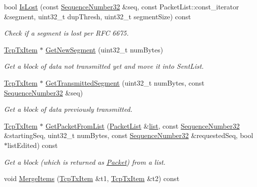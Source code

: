 \begin{DoxyCompactItemize}
\item 
bool \hyperlink{classns3_1_1TcpTxBuffer_abef1df59556801517ac6f99c3bf135cf}{Is\+Lost} (const \hyperlink{group__network_gacb2070e4e98d2d5135c9bede58f07a03}{Sequence\+Number32} \&seq, const Packet\+List\+::const\+\_\+iterator \&segment, uint32\+\_\+t dup\+Thresh, uint32\+\_\+t segment\+Size) const 
\begin{DoxyCompactList}\small\item\em Check if a segment is lost per R\+FC 6675. \end{DoxyCompactList}\item 
\hyperlink{classns3_1_1TcpTxItem}{Tcp\+Tx\+Item} $\ast$ \hyperlink{classns3_1_1TcpTxBuffer_a7f8012f60263f1184f63d68f95d9fed6}{Get\+New\+Segment} (uint32\+\_\+t num\+Bytes)
\begin{DoxyCompactList}\small\item\em Get a block of data not transmitted yet and move it into Sent\+List. \end{DoxyCompactList}\item 
\hyperlink{classns3_1_1TcpTxItem}{Tcp\+Tx\+Item} $\ast$ \hyperlink{classns3_1_1TcpTxBuffer_a4de9715c65893a5cb8a869e72ed7bb10}{Get\+Transmitted\+Segment} (uint32\+\_\+t num\+Bytes, const \hyperlink{group__network_gacb2070e4e98d2d5135c9bede58f07a03}{Sequence\+Number32} \&seq)
\begin{DoxyCompactList}\small\item\em Get a block of data previously transmitted. \end{DoxyCompactList}\item 
\hyperlink{classns3_1_1TcpTxItem}{Tcp\+Tx\+Item} $\ast$ \hyperlink{classns3_1_1TcpTxBuffer_a0528a0261fe39fdb95526c24801f1091}{Get\+Packet\+From\+List} (\hyperlink{classns3_1_1TcpTxBuffer_a4abe4f4a277dc558fb81c87ca71d5982}{Packet\+List} \&\hyperlink{openflow-interface_8h_afd9bcfa176617760671b67580f536fa7}{list}, const \hyperlink{group__network_gacb2070e4e98d2d5135c9bede58f07a03}{Sequence\+Number32} \&starting\+Seq, uint32\+\_\+t num\+Bytes, const \hyperlink{group__network_gacb2070e4e98d2d5135c9bede58f07a03}{Sequence\+Number32} \&requested\+Seq, bool $\ast$list\+Edited) const 
\begin{DoxyCompactList}\small\item\em Get a block (which is returned as \hyperlink{classns3_1_1Packet}{Packet}) from a list. \end{DoxyCompactList}\item 
void \hyperlink{classns3_1_1TcpTxBuffer_aee57c32104926f7d4bfdeb12f05a6db1}{Merge\+Items} (\hyperlink{classns3_1_1TcpTxItem}{Tcp\+Tx\+Item} \&t1, \hyperlink{classns3_1_1TcpTxItem}{Tcp\+Tx\+Item} \&t2) const 

\end{DoxyCompactItemize}
